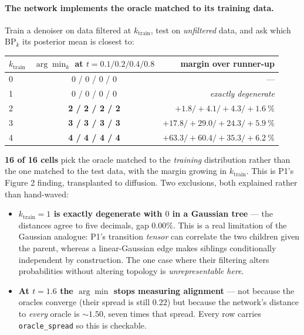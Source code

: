 \documentclass[11pt]{article}
\theoremstyle{remark}
\newcommand{\code}[1]{\texttt{\small #1}}
\begin{document}
\paragraph{The network implements the oracle matched to its training data.}
Train a denoiser on data filtered at $k_{\mathrm{train}}$, test on
\emph{unfiltered} data, and ask which $\mathrm{BP}_k$ its posterior mean is
closest to:

\begin{center}
\begin{tabular}{@{}lcr@{}}
\toprule
$k_{\mathrm{train}}$ & $\arg\min_k$ at $t = 0.1 / 0.2 / 0.4 / 0.8$ &
  margin over runner-up \\
\midrule
0 & 0 / 0 / 0 / 0 & --- \\
1 & 0 / 0 / 0 / 0 & \emph{exactly degenerate} \\
2 & \textbf{2 / 2 / 2 / 2} & $+1.8 / +4.1 / +4.3 / +1.6\ \%$ \\
3 & \textbf{3 / 3 / 3 / 3} & $+17.8 / +29.0 / +24.3 / +5.9\ \%$ \\
4 & \textbf{4 / 4 / 4 / 4} & $+63.3 / +60.4 / +35.3 / +6.2\ \%$ \\
\bottomrule
\end{tabular}
\end{center}

\textbf{16 of 16 cells} pick the oracle matched to the \emph{training}
distribution rather than the one matched to the test data, with the margin
growing in $k_{\mathrm{train}}$. This is P1's Figure 2 finding, transplanted to
diffusion. Two exclusions, both explained rather than hand-waved:

\begin{itemize}[nosep]
  \item \textbf{$k_{\mathrm{train}}=1$ is exactly degenerate with $0$ in a
    Gaussian tree} --- the distances agree to five decimals, gap $0.00\%$. This
    is a real limitation of the Gaussian analogue: P1's transition \emph{tensor}
    can correlate the two children given the parent, whereas a linear-Gaussian
    edge makes siblings conditionally independent by construction. The one case
    where their filtering alters probabilities without altering topology is
    \emph{unrepresentable here}.
  \item \textbf{At $t=1.6$ the $\arg\min$ stops measuring alignment} --- not
    because the oracles converge (their spread is still $0.22$) but because the
    network's distance to \emph{every} oracle is $\sim1.50$, seven times that
    spread. Every row carries \code{oracle\_spread} so this is checkable.
\end{itemize}
\end{document}
